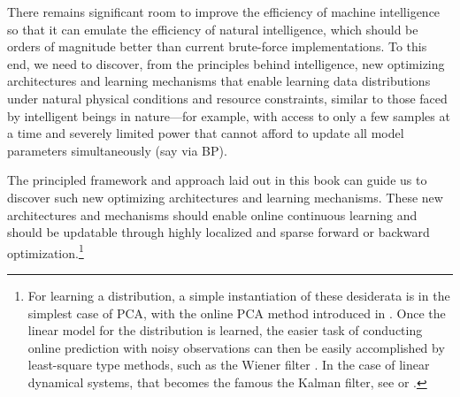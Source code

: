 \documentclass[../../book-main.tex]{subfiles}
\begin{document}
There remains significant room to improve the efficiency of machine
intelligence so that it can emulate the efficiency of natural
intelligence, which should be orders of magnitude better than
current brute-force implementations. To this end, we need to discover,
from the principles behind intelligence, new optimizing architectures and 
learning mechanisms that enable learning data distributions under natural 
physical conditions and resource constraints, similar to those faced by 
intelligent beings in nature---for example, with access to only a few 
samples at a time and severely limited power that cannot afford to update 
all model parameters simultaneously (say via BP).

The principled framework and approach laid out in this book can guide
us to discover such new optimizing architectures and learning mechanisms. 
These new architectures and mechanisms should enable online continuous learning
and should be updatable through highly localized and sparse forward
or backward optimization.\footnote{For learning a distribution, a
simple instantiation of these desiderata is in the simplest case of
PCA, with the online PCA method introduced in 
. Once the linear model for the 
distribution is learned, the easier task of conducting online prediction 
with noisy observations can then be easily accomplished by least-square
type methods, such as the Wiener filter \cite{Wiener-1942,Wiener-1949}. 
In the case of linear dynamical systems, that becomes the famous
the Kalman filter, see \cite[Appendix B]{MaY2003} or 
\citep{peng2025mathematics}.}
\end{document}
